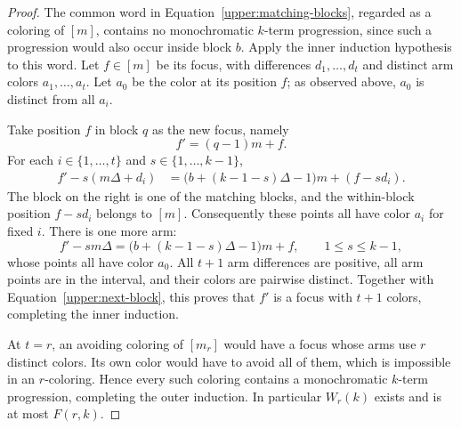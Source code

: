 \begin{proof}
The common word in Equation~\eqref{upper:matching-blocks}, regarded
as a coloring of $[m]$, contains no monochromatic $k$-term progression,
since such a progression would also occur inside block $b$.
Apply the inner induction hypothesis to this word.  Let $f\in[m]$
be its focus, with differences $d_1,\ldots,d_t$ and distinct arm
colors $a_1,\ldots,a_t$.  Let $a_0$ be the color at its position $f$;
as observed above, $a_0$ is distinct from all $a_i$.

Take position $f$ in block $q$ as the new focus, namely
\[
 f'=(q-1)m+f.
\]
For each $i\in\{1,\ldots,t\}$ and $s\in\{1,\ldots,k-1\}$,
\begin{align*}
 f'-s(m\Delta+d_i)
 &=\bigl(b+(k-1-s)\Delta-1\bigr)m+(f-sd_i).
\end{align*}
The block on the right is one of the matching blocks, and the
within-block position $f-sd_i$ belongs to $[m]$.
Consequently these points all have color $a_i$ for fixed $i$.
There is one more arm:
\[
 f'-sm\Delta
 =\bigl(b+(k-1-s)\Delta-1\bigr)m+f,
 \qquad 1\le s\le k-1,
\]
whose points all have color $a_0$.
All $t+1$ arm differences are positive, all arm points are in the
interval, and their colors are pairwise distinct.  Together with
Equation~\eqref{upper:next-block}, this proves that $f'$ is a focus
with $t+1$ colors, completing the inner induction.

At $t=r$, an avoiding coloring of $[m_r]$ would have a focus whose
arms use $r$ distinct colors.  Its own color would have to avoid all
of them, which is impossible in an $r$-coloring.  Hence every such
coloring contains a monochromatic $k$-term progression, completing
the outer induction.  In particular $W_r(k)$ exists and is at most
$F(r,k)$.
\end{proof}
